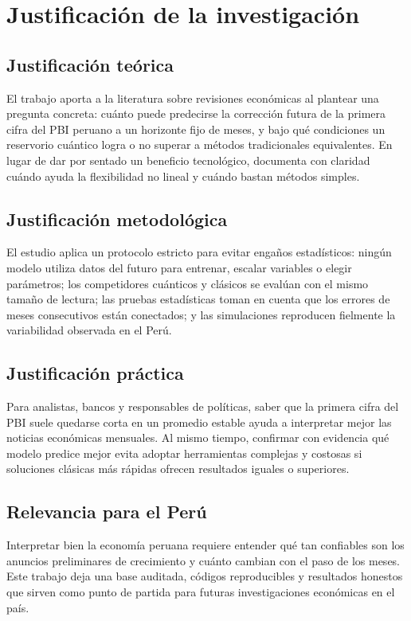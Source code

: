 \section{Justificación de la investigación}

\subsection{Justificación teórica}

El trabajo aporta a la literatura sobre revisiones económicas al plantear una pregunta concreta: cuánto puede predecirse la corrección futura de la primera cifra del PBI peruano a un horizonte fijo de meses, y bajo qué condiciones un reservorio cuántico logra o no superar a métodos tradicionales equivalentes. En lugar de dar por sentado un beneficio tecnológico, documenta con claridad cuándo ayuda la flexibilidad no lineal y cuándo bastan métodos simples.

\subsection{Justificación metodológica}

El estudio aplica un protocolo estricto para evitar engaños estadísticos: ningún modelo utiliza datos del futuro para entrenar, escalar variables o elegir parámetros; los competidores cuánticos y clásicos se evalúan con el mismo tamaño de lectura; las pruebas estadísticas toman en cuenta que los errores de meses consecutivos están conectados; y las simulaciones reproducen fielmente la variabilidad observada en el Perú.

\subsection{Justificación práctica}

Para analistas, bancos y responsables de políticas, saber que la primera cifra del PBI suele quedarse corta en un promedio estable ayuda a interpretar mejor las noticias económicas mensuales. Al mismo tiempo, confirmar con evidencia qué modelo predice mejor evita adoptar herramientas complejas y costosas si soluciones clásicas más rápidas ofrecen resultados iguales o superiores.

\subsection{Relevancia para el Perú}

Interpretar bien la economía peruana requiere entender qué tan confiables son los anuncios preliminares de crecimiento y cuánto cambian con el paso de los meses. Este trabajo deja una base auditada, códigos reproducibles y resultados honestos que sirven como punto de partida para futuras investigaciones económicas en el país.
